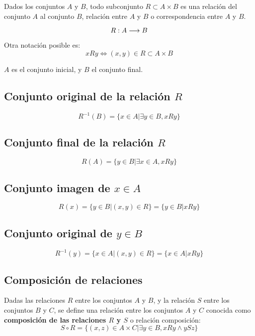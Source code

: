 Dados los conjuntos $A$ y $B$, todo subconjunto $R \subset A \times B$ es una relación del conjunto $A$ al conjunto $B$, relación entre $A$ y $B$ o correspondencia entre $A$ y $B$.

\[
R: A \longrightarrow B \\
\]

Otra notación posible es:
\[
xRy \Leftrightarrow (x,y) \in R \subset A \times B
\]

$A$ es el conjunto inicial, y $B$ el conjunto final.

\subsection{Conjunto original de la relación $R$}

\[
R^{-1}(B)=\{x \in A | \exists y \in B, xRy\}
\]

\subsection{Conjunto final de la relación $R$}

\[
R(A)=\{y \in B | \exists x \in A, xRy\}
\]

\subsection{Conjunto imagen de $x \in A$}

\[
R(x)=\{y \in B | (x,y) \in R\} = \{y \in B | xRy\}
\]

\subsection{Conjunto original de $y \in B$}

\[
R^{-1}(y)=\{x \in A | (x,y) \in R\} = \{x \in A | xRy\}
\]

\subsection{Composición de relaciones}

Dadas las relaciones $R$ entre los conjuntos $A$ y $B$, y la relación $S$ entre los conjuntos $B$ y $C$, se define una relación entre los conjuntos $A$ y $C$ conocida como \textbf{composición de las relaciones $R$ y $S$} o relación composición:
\[
S \circ R = \{(x,z) \in A \times C | \exists y \in B, xRy \wedge ySz\}
\]

